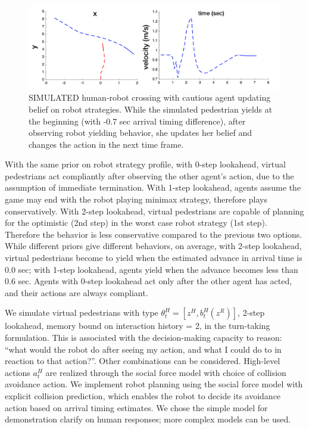 \documentclass[letterpaper, 10 pt, conference]{ieeeconf}  %
\begin{document}
   \begin{figure}[t]
      \centering
      \hspace{-5em}
      \vspace{-1em}
      \includegraphics[scale=0.37]{adaptation}
      \hspace{-5em}
      \caption{SIMULATED human-robot crossing with cautious agent updating 
      belief on robot strategies. While the simulated pedestrian yields at the 
      beginning (with -0.7 sec arrival timing difference), after observing 
      robot yielding behavior, she updates her 
      belief and changes the action in the next time frame.}
      \vspace{-1.5em}
     \label{fig:adaptation}
   \end{figure}
With the same prior on robot strategy profile, with 0-step lookahead, 
virtual pedestrians act compliantly after observing the other agent's action, 
due to the assumption of immediate termination. With 1-step lookahead, agents assume 
the game may end with the robot playing minimax strategy, therefore plays 
conservatively. With 2-step lookahead, virtual 
pedestrians are capable of planning for the optimistic (2nd step) in the 
worst case robot strategy (1st step). Therefore the behavior is less 
conservative compared to the previous two options. While different priors give 
different behaviors, on average, with 2-step lookahead, virtual pedestrians 
become to yield when the estimated advance in arrival time is 0.0 sec; with 1-step lookahead, 
agents yield when the advance becomes less than 0.6 sec. Agents with 0-step 
lookahead act only after the other agent has acted, and their actions are 
always compliant.  

We simulate virtual pedestrians with type $\theta^H_t = [z^H, b^H_t(z^R)]$, 2-step 
lookahead, memory bound on interaction history = 2,  
in the turn-taking formulation. This is associated with the decision-making 
capacity to reason: ``what would the robot do after seeing my action, and what 
I could do to in reaction to that action?''. Other combinations can be 
considered. High-level actions $a^H_t$ are realized 
through the social force model with choice of collision avoidance action.
We implement robot planning using the social force model with explicit collision 
prediction, which enables the robot to decide its avoidance action based on 
arrival timing estimates. We chose the simple model for demonstration clarify on human 
responses; more complex models can be used.
\end{document}
